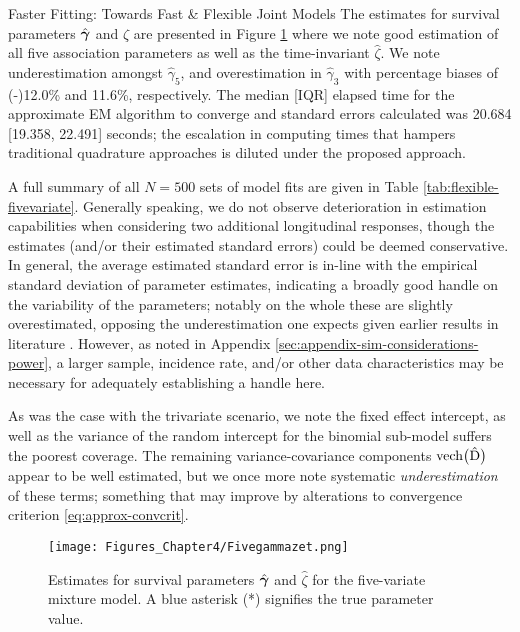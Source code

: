 \begin{chapter}{\label{cha:flexible}Faster Fitting: Towards Fast \& Flexible Joint Models}
The estimates for survival parameters $\hat{\bm{\gamma}}$ and $\hat{\zeta}$ are presented in Figure \ref{fig:flexible-sim-five} where we note good estimation of all five association parameters as well as the time-invariant $\hat{\zeta}$. We note underestimation amongst $\hat{\gamma}_5$, and overestimation in $\hat{\gamma}_3$ with percentage biases of (-)12.0\% and 11.6\%, respectively. The median [IQR] elapsed time for the approximate EM algorithm to converge and standard errors calculated was 20.684 [19.358, 22.491] seconds; the escalation in computing times that hampers traditional quadrature approaches is diluted under the proposed approach. 

A full summary of all $N=500$ sets of model fits are given in Table \ref{tab:flexible-fivevariate}. Generally speaking, we do not observe deterioration in estimation capabilities when considering two additional longitudinal responses, though the estimates (and/or their estimated standard errors) could be deemed conservative. In general, the average estimated standard error is in-line with the empirical standard deviation of parameter estimates, indicating a broadly good handle on the variability of the parameters; notably on the whole these are slightly overestimated, opposing the underestimation one expects given earlier results in literature \citep{Hsieh2006}. However, as noted in Appendix \ref{sec:appendix-sim-considerations-power}, a larger sample, incidence rate, and/or other data characteristics may be necessary for adequately establishing a handle here.

As was the case with the trivariate scenario, we note the fixed effect intercept, as well as the variance of the random intercept for the binomial sub-model suffers the poorest coverage. The remaining variance-covariance components $\text{vech}\big(\hat{\mathrm{D}}\big)$ appear to be well estimated, but we once more note systematic \textit{underestimation} of these terms; something that may improve by alterations to convergence criterion \eqref{eq:approx-convcrit}.

\begin{figure}[ht]
    \centering
    \texttt{[image: Figures\_Chapter4/Fivegammazet.png]}
    \caption{Estimates for survival parameters $\hat{\bm{\gamma}}$ and $\hat{\zeta}$ for the five-variate mixture model. A blue asterisk (*) signifies the true parameter value.}
    \label{fig:flexible-sim-five}
\end{figure}


\end{chapter}
